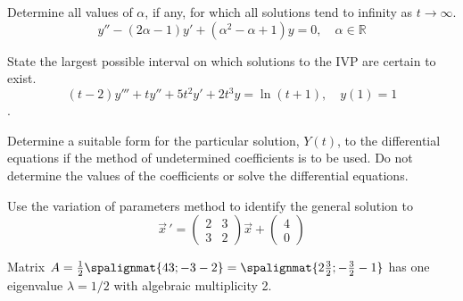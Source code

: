 \documentclass[12pt]{exam}
\begin{document}
    


\newpage \InitialsRight

\begin{questions}


    
    \question[2] Determine all values of $\alpha$, if any, for which all solutions tend to infinity as $t\to\infty$. $$y'' - (2\alpha - 1) y' + (\alpha^2-\alpha+1) y = 0, \quad \alpha \in \mathbb R$$ \vspace{5cm}  %
    
    
    \question[2] %
    State the largest possible interval on which solutions to the IVP are certain to exist. $$(t-2)y'''+ty''+5t^2y'+2t^3y = \ln (t+1), \quad y(1) = 1$$.
    \vspace{3cm}
    

    \newpage \InitialsLeft
    \question[7]  Determine a suitable form for the particular solution, $Y(t)$, to the differential equations if the method of undetermined coefficients is to be used. Do not determine the values of the coefficients or solve the differential equations. 
    


    \newpage \InitialsRight
    \question[10] Use the variation of parameters method to identify the general solution to \[\vec{x} \, ' = \left( \begin{array}{rr} 2 & 3 \\ 3 & 2 \end{array} \right) \vec{x}  + \left( \begin{array}{r}  4\\ 0\end{array} \right)  \]

    \newpage \InitialsLeft
    \Scratch 
        
    \newpage \InitialsRight
    \question[10] 
    Matrix $A = \frac 12 \spalignmat{4 3;-3 -2} = \spalignmat{2 \frac32;-\frac32 -1}$ has one eigenvalue $\lambda = 1/2$ with algebraic multiplicity 2. %


\end{questions}
\end{document}
